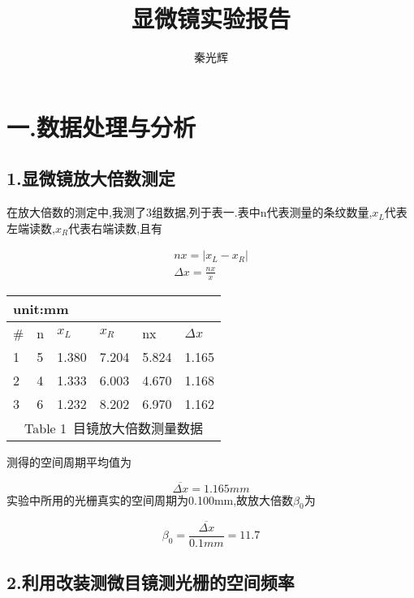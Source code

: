 \documentclass[a4paper,10pt,notitlepage]{report}
\begin{document}
\title{显微镜实验报告}
\author{秦光辉}
\maketitle

\section*{一.数据处理与分析}
\subsection*{1.显微镜放大倍数测定}

	在放大倍数的测定中,我测了3组数据,列于表一.表中n代表测量的条纹数量,$x_L$代表左端读数,$x_R$代表右端读数,且有
	
\begin{align}
	nx = |x_L - x_R| \\
	\Delta x = \frac{nx}{x} 
\end{align}
	
\begin{table}[htbp]
\centering

	\begin{tabular}{|l|l|l|l|l|l|}
		
		\multicolumn{3}{l}{\scriptsize unit:mm} \\
		\hline
		\# & n & $x_L$ & $x_R$ & nx & $\Delta x$ \\
		\hline 
		1 & 5 & 1.380 & 7.204 & 5.824 & 1.165 \\
		\hline
		2 & 4 & 1.333 & 6.003 & 4.670 & 1.168 \\
		\hline
		3 & 6 & 1.232 & 8.202 & 6.970 & 1.162 \\
		\hline
		\multicolumn{6}{c}{\scriptsize Table 1\ 目镜放大倍数测量数据}
	
	\end{tabular}

\end{table}

	测得的空间周期平均值为
	
\begin{equation}
	\overline{\Delta x} = 1.165mm
\end{equation}
	实验中所用的光栅真实的空间周期为0.100mm,故放大倍数$\beta_0$为
	
\begin{equation}
	\beta_0 = \frac{\overline{\Delta x}}{0.1mm} = 11.7
\end{equation}

\subsection*{2.利用改装测微目镜测光栅的空间频率}
\end{document}
